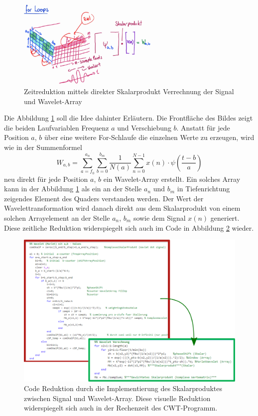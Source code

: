 \begin{figure}
	\centering
	\includegraphics[width=0.6\textwidth]{papers/wavelets/images/14-1_EliminationForLoops.png}
	\caption{Zeitreduktion mittels direkter Skalarprodukt Verrechnung der Signal und Wavelet-Array}
	\label{wavelet:fig:EliminationForLoops}
\end{figure}

Die Abbildung \ref{wavelet:fig:EliminationForLoops} soll die Idee dahinter Erläutern. Die Frontfläche des Bildes zeigt die beiden Laufvariablen Frequenz $a$ und Verschiebung $b$. Anstatt für jede Position $a$, $b$ über eine weitere For-Schlaufe die einzelnen Werte zu erzeugen, wird wie in der Summenformel \[W_{a,b}=\sum_{a=f_0}^{a_n}\sum_{b=0}^{b_m}\frac{1}{N(a)}\sum_{n=0}^{N-1} x(n)\cdot\psi\left(\frac{t-b}{a}\right)\] neu direkt für jede Position $a$, $b$ ein Wavelet-Array erstellt. Ein solches Array kann in der Abbildung \ref{wavelet:fig:EliminationForLoops} als ein an der Stelle $a_n$ und $b_m$ in Tiefenrichtung zeigendes Element des Quaders verstanden werden. Der Wert der Wavelettransformation wird danach direkt aus dem Skalarprodukt von einem solchen Arrayelement an der Stelle $a_n$, $b_m$ sowie dem Signal $x(n)$ generiert.
Diese zeitliche Reduktion widerspiegelt sich auch im Code in Abbildung \ref{wavelet:fig:EliminationForLoopCode} wieder.

\begin{figure}
	\centering
	\includegraphics[width=\textwidth]{papers/wavelets/images/14-2_CodeSkalarProd.png}
	\caption{Code Reduktion durch die Implementierung des Skalarproduktes zwischen Signal und Wavelet-Array. Diese visuelle Reduktion widerspiegelt sich auch in der Rechenzeit des CWT-Programm.}
	\label{wavelet:fig:EliminationForLoopCode}
\end{figure}

